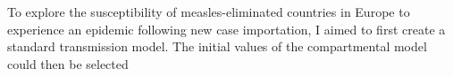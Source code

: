 \documentclass[../Paper.tex]{subfiles}
\begin{document}
  \justifying
  To explore the susceptibility of measles-eliminated countries in Europe to
  experience an epidemic following new case importation, I aimed to first create
  a standard transmission model. The initial values of the compartmental model
  could then be selected 
  \clearpage
\end{document}
